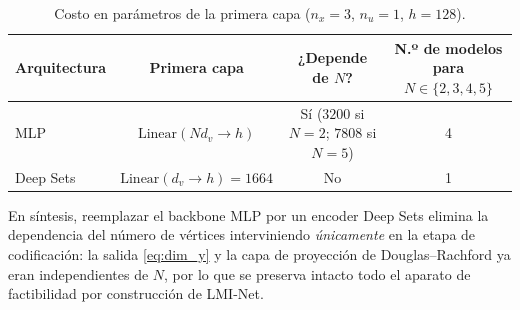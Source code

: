 \begin{table}[ht]
\centering
\caption{Costo en parámetros de la primera capa ($n_x=3$, $n_u=1$, $h=128$).}
\label{tab:params}
\begin{tabular}{lccc}
\toprule
Arquitectura & Primera capa & ¿Depende de $N$? & N.º de modelos para $N\in\{2,3,4,5\}$ \\
\midrule
MLP        & $\mathrm{Linear}(N d_v \to h)$ & Sí ($3200$ si $N{=}2$; $7808$ si $N{=}5$) & 4 \\
Deep Sets  & $\mathrm{Linear}(d_v \to h)=1664$ & No & 1 \\
\bottomrule
\end{tabular}
\end{table}

En síntesis, reemplazar el backbone MLP por un encoder Deep Sets elimina la dependencia del
número de vértices interviniendo \emph{únicamente} en la etapa de codificación: la salida
\eqref{eq:dim_y} y la capa de proyección de Douglas--Rachford ya eran independientes de $N$,
por lo que se preserva intacto todo el aparato de factibilidad por construcción de LMI-Net.
